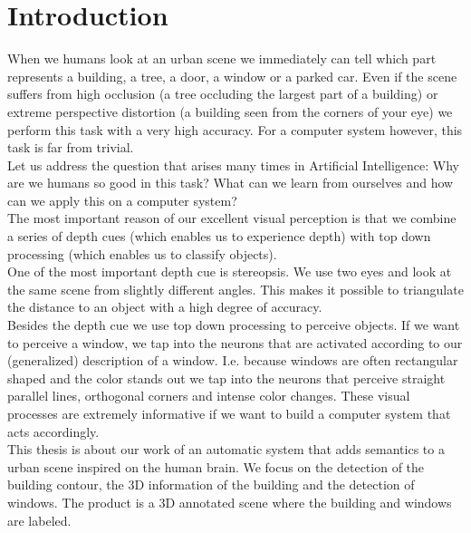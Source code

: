 \section{Introduction}
When we humans look at an urban scene we immediately can tell which part
represents a
building, a tree, a door, a window or a parked car.
Even if the scene suffers from high occlusion (a tree occluding the largest part
of a building) or extreme perspective distortion (a building seen from the
corners of your eye) we perform this task with a very high accuracy.
For a computer system however, this task is far from trivial.\\

Let us address the question that arises many times in Artificial Intelligence:
Why are we humans so good in this task? What can we learn from ourselves 
and how can we apply this on a computer system?\\

The most important reason of our excellent visual perception is that we combine 
a series of depth cues (which enables us to experience depth) with top down
processing (which enables us to classify objects).\\

One of the most important depth cue is stereopsis.  We use two eyes and look at
the same scene from slightly different angles.  This makes it possible to
triangulate the distance to an object with a high degree of accuracy. \\

Besides the depth cue we use top down processing to perceive objects.  If we want
to perceive a window, we tap into the neurons that are activated according to
our (generalized) description of a window.  I.e. because windows are often
rectangular shaped and the color stands out we tap into the neurons that
perceive straight parallel lines, orthogonal corners and intense color changes.
These visual processes are extremely informative if we want to build a computer system
that acts accordingly.  \\

This thesis is about our work of an automatic system that adds semantics to a
urban scene inspired on the human brain. We focus on the detection of the
building contour, the 3D information of the building and the detection of
windows.  The product is a 3D annotated scene where the building and windows are labeled.\\

